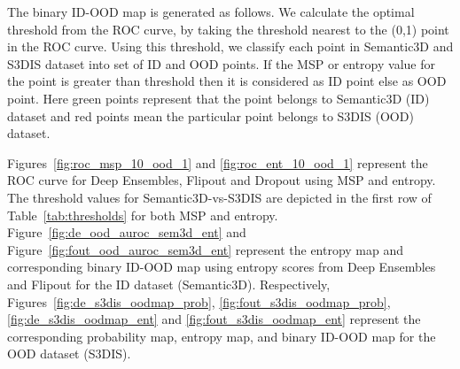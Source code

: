     The binary ID-OOD map is generated as follows. We calculate the optimal threshold from the ROC curve, by taking the threshold nearest to the (0,1) point in the ROC curve.
    Using this threshold, we classify each point in Semantic3D and S3DIS dataset into set of ID and OOD points.
    If the MSP or entropy value for the point is greater than threshold then it is considered as ID point else as OOD point.
    Here green points represent that the point belongs to Semantic3D (ID) dataset and red points mean the particular point belongs to S3DIS (OOD) dataset.
    
    Figures~\ref{fig:roc_msp_10_ood_1} and \ref{fig:roc_ent_10_ood_1} represent the ROC curve for Deep Ensembles, Flipout and Dropout using MSP and entropy.
    The threshold values for Semantic3D-vs-S3DIS are depicted in the first row of Table~\ref{tab:thresholds} for both MSP and entropy.
    Figure~\ref{fig:de_ood_auroc_sem3d_ent} and Figure~\ref{fig:fout_ood_auroc_sem3d_ent} represent the entropy map and corresponding binary ID-OOD map using entropy scores from Deep Ensembles and Flipout for the ID dataset (Semantic3D).
    Respectively, Figures~\ref{fig:de_s3dis_oodmap_prob}, \ref{fig:fout_s3dis_oodmap_prob}, \ref{fig:de_s3dis_oodmap_ent} and \ref{fig:fout_s3dis_oodmap_ent} represent the corresponding probability map, entropy map, and binary ID-OOD map for the OOD dataset (S3DIS).
     
